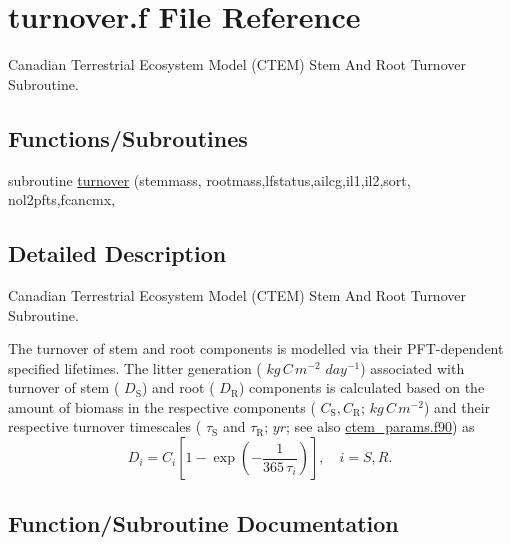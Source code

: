 \hypertarget{turnover_8f}{}\section{turnover.\+f File Reference}
\label{turnover_8f}


Canadian Terrestrial Ecosystem Model (C\+T\+E\+M) Stem And Root Turnover Subroutine.  


\subsection*{Functions/\+Subroutines}
\begin{DoxyCompactItemize}
\item 
subroutine \hyperlink{turnover_8f_a3cab47e670d977409bfe234418add754}{turnover} (stemmass, rootmass,lfstatus,ailcg,il1,il2,sort, nol2pfts,fcancmx,
\end{DoxyCompactItemize}


\subsection{Detailed Description}
Canadian Terrestrial Ecosystem Model (C\+T\+E\+M) Stem And Root Turnover Subroutine. 

The turnover of stem and root components is modelled via their P\+F\+T-\/dependent specified lifetimes. The litter generation ( $kg\,C\,m^{-2}$ $day^{-1}$) associated with turnover of stem ( $D_\mathrm{S}$) and root ( $D_\mathrm{R}$) components is calculated based on the amount of biomass in the respective components ( $C_\mathrm{S}, C_\mathrm{R}$; $kg\,C\,m^{-2}$) and their respective turnover timescales ( $\tau_\mathrm{S}$ and $\tau_\mathrm{R}$; $yr$; see also \hyperlink{ctem__params_8f90}{ctem\+\_\+params.\+f90}) as \[ \label{citod} D_{i} = C_{i}\left[1 - \exp\left(-\frac{1}{365\,\tau_{i}}\right)\right],\quad i = S, R.\] 

\subsection{Function/\+Subroutine Documentation}
\hypertarget{turnover_8f_a3cab47e670d977409bfe234418add754}{}
